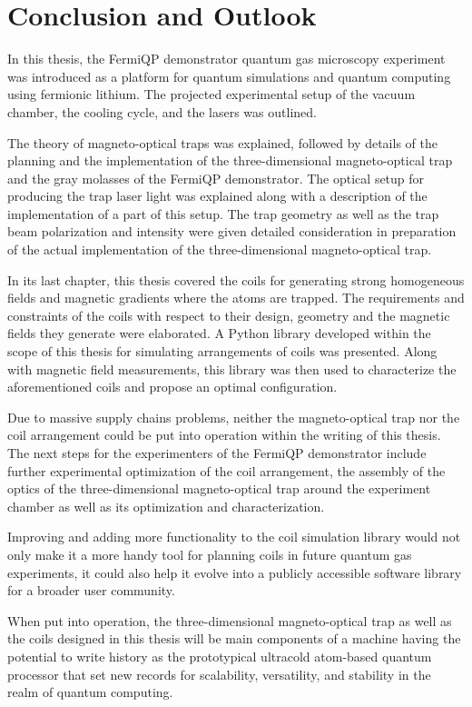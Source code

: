 \renewcommand{\imagepath}{../50-outro/img}

\chapter{Conclusion and Outlook}
In this thesis, the FermiQP demonstrator quantum gas microscopy experiment was introduced as a platform for quantum simulations and quantum computing using fermionic lithium. The projected experimental setup of the vacuum chamber, the cooling cycle, and the lasers was outlined.

The theory of magneto-optical traps was explained, followed by details of the planning and the implementation of the three-dimensional magneto-optical trap and the gray molasses of the FermiQP demonstrator. The optical setup for producing the trap laser light was explained along with a description of the implementation of a part of this setup. The trap geometry as well as the trap beam polarization and intensity were given detailed consideration in preparation of the actual implementation of the three-dimensional magneto-optical trap.

In its last chapter, this thesis covered the coils for generating strong homogeneous fields and magnetic gradients where the atoms are trapped. The requirements and constraints of the coils with respect to their design, geometry and the magnetic fields they generate were elaborated. A Python library developed within the scope of this thesis  for simulating arrangements of coils was presented. Along with magnetic field measurements, this library was then used to characterize the aforementioned coils and propose an optimal configuration.

Due to massive supply chains problems, neither the magneto-optical trap nor the coil arrangement could be put into operation within the writing of this thesis. The next steps for the experimenters of the FermiQP demonstrator include further experimental optimization of the coil arrangement, the assembly of the optics of the three-dimensional magneto-optical trap around the experiment chamber as well as its optimization and  characterization.

Improving and adding more functionality to the coil simulation library would not only make it a more handy tool for planning coils in future quantum gas experiments, it could also help it evolve into a publicly accessible software library for a broader user community.

When put into operation, the three-dimensional magneto-optical trap as well as the coils designed in this thesis will be main components of a machine having the potential to write history as the prototypical ultracold atom-based quantum processor that set new records for scalability, versatility, and stability in the realm of quantum computing.